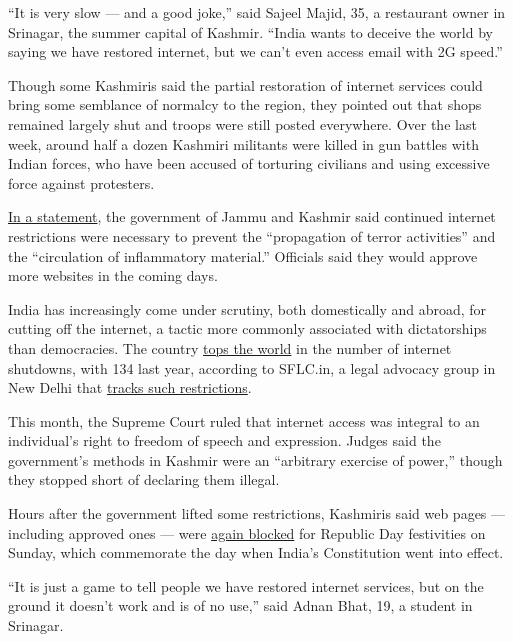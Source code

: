 ``It is very slow --- and a good joke,'' said Sajeel Majid, 35, a
restaurant owner in Srinagar, the summer capital of Kashmir. ``India
wants to deceive the world by saying we have restored internet, but we
can't even access email with 2G speed.''

Though some Kashmiris said the partial restoration of internet services
could bring some semblance of normalcy to the region, they pointed out
that shops remained largely shut and troops were still posted
everywhere. Over the last week, around half a dozen Kashmiri militants
were killed in gun battles with Indian forces, who have been accused of
torturing civilians and using excessive force against protesters.

\href{https://twitter.com/NEETAS11/status/1220765770876981248/photo/1}{In
a statement}, the government of Jammu and Kashmir said continued
internet restrictions were necessary to prevent the ``propagation of
terror activities'' and the ``circulation of inflammatory material.''
Officials said they would approve more websites in the coming days.

India has increasingly come under scrutiny, both domestically and
abroad, for cutting off the internet, a tactic more commonly associated
with dictatorships than democracies. The country
\href{https://www.nytimes.com/2019/12/17/world/asia/india-internet-modi-protests.html}{tops
the world} in the number of internet shutdowns, with 134 last year,
according to SFLC.in, a legal advocacy group in New Delhi that
\href{https://internetshutdowns.in/}{tracks such restrictions}.

This month, the Supreme Court ruled that internet access was integral to
an individual's right to freedom of speech and expression. Judges said
the government's methods in Kashmir were an ``arbitrary exercise of
power,'' though they stopped short of declaring them illegal.

Hours after the government lifted some restrictions, Kashmiris said web
pages --- including approved ones --- were
\href{https://www.thehindu.com/news/national/low-speed-mobile-internet-in-kashmir-temporarily-suspended-to-resume-after-republic-day-celebrations/article30654435.ece}{again
blocked} for Republic Day festivities on Sunday, which commemorate the
day when India's Constitution went into effect.

``It is just a game to tell people we have restored internet services,
but on the ground it doesn't work and is of no use,'' said Adnan Bhat,
19, a student in Srinagar.

